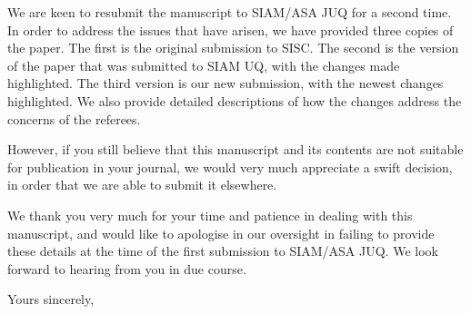 \documentclass{letter}
\begin{document}
\begin{letter}{ }
We are keen to resubmit the manuscript to SIAM/ASA JUQ for a second time. In order to address the issues that have arisen, we have provided three copies of the paper. The first is the original submission to SISC. The second is the version of the paper that was submitted to SIAM UQ, with the changes made highlighted. The third version is our new submission, with the newest changes highlighted. We also provide detailed descriptions of how the changes address the concerns of the referees.

However, if you still believe that this manuscript and its contents are not suitable for publication in your journal, we would very much appreciate a swift decision, in order that we are able to submit it elsewhere.

We thank you very much for your time and patience in dealing with this manuscript, and would like to apologise in our oversight in failing to provide these details at the time of the first submission to SIAM/ASA JUQ. We look forward to hearing from you in due course.

\closing{Yours sincerely,}
\end{letter}
\end{document}
